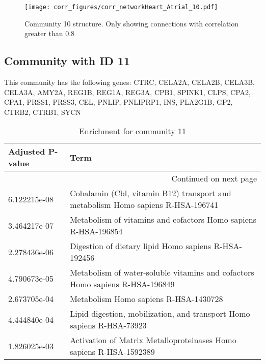 \begin{figure}[h!]
\centering
\texttt{[image: corr\_figures/corr\_networkHeart\_Atrial\_10.pdf]}
\caption{Community 10 structure. Only showing connections with correlation greater than 0.8}
\end{figure}




\subsection*{Community with ID 11}
This community has the following genes: CTRC, CELA2A, CELA2B, CELA3B, CELA3A, AMY2A, REG1B, REG1A, REG3A, CPB1, SPINK1, CLPS, CPA2, CPA1, PRSS1, PRSS3, CEL, PNLIP, PNLIPRP1, INS, PLA2G1B, GP2, CTRB2, CTRB1, SYCN
\\
\begin{longtable}{p{2.4cm}p{14.5cm}}
\caption{Enrichment for community 11}\\
\toprule
Adjusted \newline P-value &                                                                             Term \\
\midrule
\endhead
\midrule
\multicolumn{2}{r}{{Continued on next page}} \\
\midrule
\endfoot

\bottomrule
\endlastfoot
             6.122215e-08 &  Cobalamin (Cbl, vitamin B12) transport and metabolism Homo sapiens R-HSA-196741 \\
             3.464217e-07 &                   Metabolism of vitamins and cofactors Homo sapiens R-HSA-196854 \\
             2.278436e-06 &                             Digestion of dietary lipid Homo sapiens R-HSA-192456 \\
             4.790673e-05 &     Metabolism of water-soluble vitamins and cofactors Homo sapiens R-HSA-196849 \\
             2.673705e-04 &                                            Metabolism Homo sapiens R-HSA-1430728 \\
             4.444840e-04 &            Lipid digestion, mobilization, and transport Homo sapiens R-HSA-73923 \\
             1.826025e-03 &               Activation of Matrix Metalloproteinases Homo sapiens R-HSA-1592389 \\
\end{longtable}


